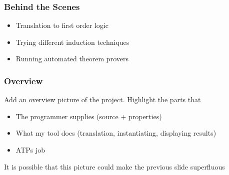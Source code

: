 \documentclass[serif,professionalfont]{beamer}
\begin{document}
\newcommand{\defBNF}[4] {\text{#1}\quad&#2&::=&\;#3&\text{#4}}
\newcommand{\defaltBNF}[2] {&&|&\;#1&\text{#2}}

\newcommand{\hstup}[2]{\hs{(} #1 \hs{,} #2 \hs{)}}

\newcommand{\nsqsubseteq}{\,\,\, /\!\!\!\!\!\!\sqsubseteq}

\newcommand{\bindname}{>\!\!>\!\!=}
\newcommand{\bind}[2]{#1 \bindname #2}
\newcommand{\bindp}[3]{\fn{bind'}(#1,#2,#3)}
\newcommand{\fork}[2]{\fn{fork}(#1,#2)}
\newcommand{\forkr}[1]{\fn{right}(#1)}
\newcommand{\forkl}[1]{\fn{left}(#1)}
\newcommand{\leaf}[1]{\fn{leaf}(#1)}
\newcommand{\unleaf}[1]{\fn{unleaf}(#1)}
\newcommand{\return}[1]{\fn{return}(#1)}

\newcommand{\bindb}[2]{#1 \tofix{\bindname} #2}
\newcommand{\bindw}[2]{#1 \unfix{\bindname} #2}


\newcommand\Inf{\fn{Inf}}
\newcommand\Total{\fn{Total}}
\newcommand\Fin{\fn{Fin}}

\begin{frame}
  \frametitle{Behind the Scenes}
  \begin{itemize}
    \item Translation to first order logic\\
    \item Trying different induction techniques\\
    \item Running automated theorem provers\\
  \end{itemize}
\end{frame}

\begin{frame}
\frametitle{Overview}

Add an overview picture of the project. Highlight the parts that

\begin{itemize}
\item The programmer supplies (source + properties)
\item What my tool does (translation, instantiating, displaying results)
\item ATPs job
\end{itemize}

It is possible that this picture could make the previous slide superfluous

\end{frame}
\end{document}
